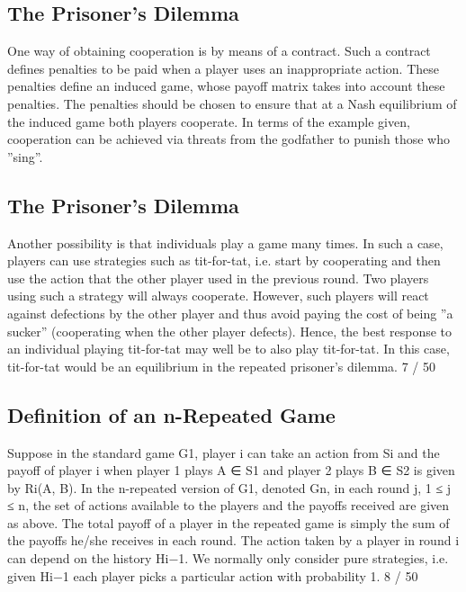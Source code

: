\documentclass[]{report}
\begin{document}
\subsection{The Prisoner’s Dilemma}
One way of obtaining cooperation is by means of a contract.
Such a contract defines penalties to be paid when a player uses an
inappropriate action. These penalties define an induced game,
whose payoff matrix takes into account these penalties.
The penalties should be chosen to ensure that at a Nash
equilibrium of the induced game both players cooperate.
In terms of the example given, cooperation can be achieved via
threats from the godfather to punish those who ”sing”.
\subsection{The Prisoner’s Dilemma}
Another possibility is that individuals play a game many times.
In such a case, players can use strategies such as tit-for-tat, i.e.
start by cooperating and then use the action that the other player
used in the previous round.
Two players using such a strategy will always cooperate. However,
such players will react against defections by the other player and
thus avoid paying the cost of being ”a sucker” (cooperating when
the other player defects).
Hence, the best response to an individual playing tit-for-tat may
well be to also play tit-for-tat. In this case, tit-for-tat would be an
equilibrium in the repeated prisoner’s dilemma.
7 / 50
\subsection{Definition of an n-Repeated Game}
Suppose in the standard game G1, player i can take an action from
Si and the payoff of player i when player 1 plays A ∈ S1 and player
2 plays B ∈ S2 is given by Ri(A, B).
In the n-repeated version of G1, denoted Gn, in each round j,
1 ≤ j ≤ n, the set of actions available to the players and the
payoffs received are given as above.
The total payoff of a player in the repeated game is simply the sum
of the payoffs he/she receives in each round.
The action taken by a player in round i can depend on the history
Hi−1. We normally only consider pure strategies, i.e. given Hi−1
each player picks a particular action with probability 1.
8 / 50
\end{document}
